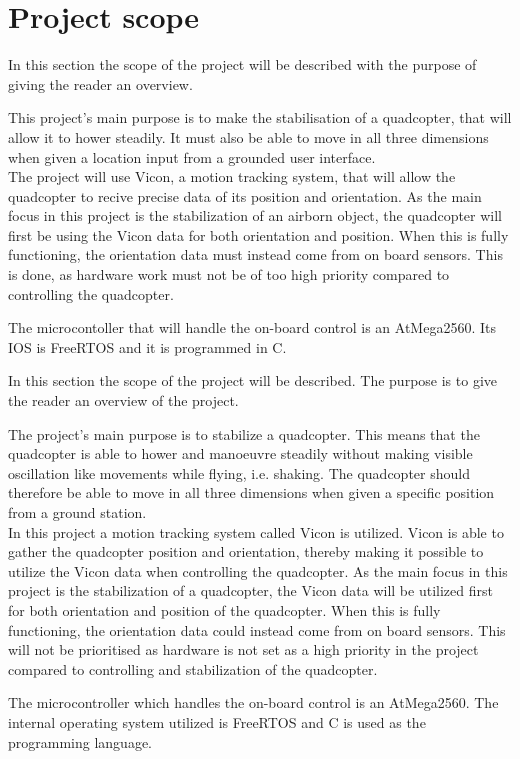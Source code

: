 \section{Project scope}

In this section the scope of the project will be described with the purpose of giving the reader an overview. \newpar

This project's main purpose is to make the stabilisation of a quadcopter, that will allow it to hower steadily. It must also be able to move in all three dimensions when given a location input from a grounded user interface. \\
The project will use Vicon, a motion tracking system, that will allow the quadcopter to recive precise data of its position and orientation. 
As the main focus in this project is the stabilization of an airborn object, the quadcopter will first be using the Vicon data for both orientation and position. When this is fully functioning, the orientation data must instead come from on board sensors. This is done, as hardware work must not be of too high priority compared to controlling the quadcopter. \newpar

The microcontoller that will handle the on-board control is an AtMega2560. Its IOS is FreeRTOS and it is programmed in C. 


In this section the scope of the project will be described. The purpose is to give the reader an overview of the project. \newpar

The project's main purpose is to stabilize a quadcopter. This means that the quadcopter is able to hower and manoeuvre steadily without making visible oscillation like movements while flying, i.e. shaking. The quadcopter should therefore be able to move in all three dimensions when given a specific position from a ground station. \\
In this project a motion tracking system called Vicon is utilized. Vicon is able to gather the quadcopter position and orientation, thereby making it possible to utilize the Vicon data when controlling the quadcopter. 
As the main focus in this project is the stabilization of a quadcopter, the Vicon data will be utilized first for both orientation and position of the quadcopter. When this is fully functioning, the orientation data could instead come from on board sensors. This will not be prioritised as hardware is not set as a high priority in the project compared to controlling and stabilization of the quadcopter. \newpar

The microcontroller which handles the on-board control is an AtMega2560. The internal operating system utilized is FreeRTOS and C is used as the programming language.